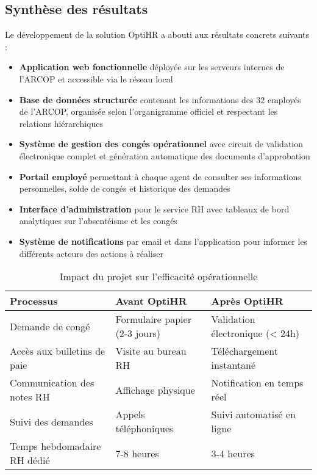 \subsection{Synthèse des résultats}
Le développement de la solution OptiHR a abouti aux résultats concrets suivants :

\begin{itemize}
    \item \textbf{Application web fonctionnelle} déployée sur les serveurs internes de l'ARCOP et accessible via le réseau local
    
    \item \textbf{Base de données structurée} contenant les informations des 32 employés de l'ARCOP, organisée selon l'organigramme officiel et respectant les relations hiérarchiques
    
    \item \textbf{Système de gestion des congés opérationnel} avec circuit de validation électronique complet et génération automatique des documents d'approbation
    
    \item \textbf{Portail employé} permettant à chaque agent de consulter ses informations personnelles, solde de congés et historique des demandes
    
    \item \textbf{Interface d'administration} pour le service RH avec tableaux de bord analytiques sur l'absentéisme et les congés
    
    \item \textbf{Système de notifications} par email et dans l'application pour informer les différents acteurs des actions à réaliser
\end{itemize}

\begin{table}[H]
\centering
\caption{Impact du projet sur l'efficacité opérationnelle}
\label{tab:impact}
\begin{tabular}{|p{5cm}|p{5cm}|p{4cm}|}
\hline
\textbf{Processus} & \textbf{Avant OptiHR} & \textbf{Après OptiHR} \\
\hline
Demande de congé & Formulaire papier (2-3 jours) & Validation électronique (< 24h) \\
\hline
Accès aux bulletins de paie & Visite au bureau RH & Téléchargement instantané \\
\hline
Communication des notes RH & Affichage physique & Notification en temps réel \\
\hline
Suivi des demandes & Appels téléphoniques & Suivi automatisé en ligne \\
\hline
Temps hebdomadaire RH dédié & 7-8 heures & 3-4 heures \\
\hline
\end{tabular}
\end{table}

